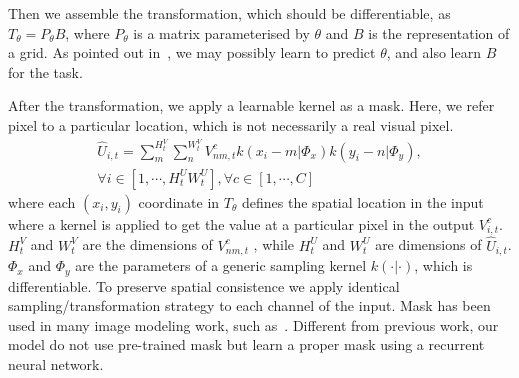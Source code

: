\documentclass[10pt,twocolumn,letterpaper]{article}
\begin{document}
	
	Then we assemble the transformation, which should be differentiable, as $T_{\theta}=P_\theta B$, where $P_\theta$ is a matrix parameterised by $\theta$ and $B$ is the representation of a grid. As pointed out in~\cite{}, we may possibly learn to predict $\theta$, and also learn $B$ for the task.
	
	After the transformation, we apply a learnable kernel as a mask. Here, we refer pixel to a particular location, which is not necessarily a real visual pixel.
	\begin{equation}
	\begin{array}{l}
	\hat{U}_{i,t} = \sum\limits_m^{H^V_t} {\sum\limits_n^{W^V_t} {V_{nm,t}^c} } k(x_i - m|{\Phi _x})k(y_i - n|{\Phi _y}),\\
	\forall i \in [1, \cdots ,H^U_ t W^U_t], \forall c \in [1, \cdots ,C]
	\end{array}
	\end{equation}
	where each $(x _i, y_i)$ coordinate in $T_\theta $ defines the spatial location in the input where a kernel is applied to get the value at a particular pixel in the output $V_{i,t}^c$. $H_t^V$  and $W_t^V$ are the dimensions of $V^c_{nm,t}$ , while $H_t^U$ and $W_t^U$ are dimensions of $\hat{U}_{i,t}$. $\Phi _x$ and $\Phi _y$ are the parameters of a generic sampling kernel $k(\cdot|\cdot )$, which is differentiable. To preserve spatial consistence we apply identical sampling/transformation strategy to each channel of the input. Mask has been used in many image modeling work, such as~\cite{dinh2014nice,dinh2016density,larochelle2011neural,mathieu2015masked,van2016pixel}. Different from previous work, our model do not use pre-trained mask but learn a proper mask using a recurrent neural network.
	
\end{document}
